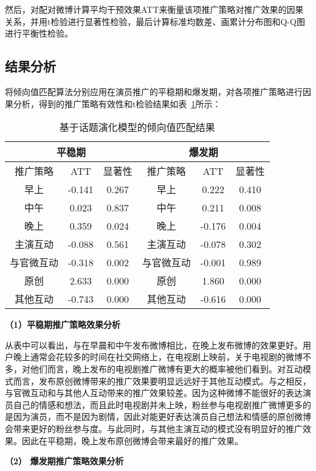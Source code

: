 然后，对配对微博计算平均干预效果ATT来衡量该项推广策略对推广效果的因果关系，并用t检验进行显著性检验，最后计算标准均数差、画累计分布图和Q-Q图进行平衡性检验。

\subsection{结果分析}

将倾向值匹配算法分别应用在演员推广的平稳期和爆发期，对各项推广策略进行因果分析，得到的推广策略有效性和t检验结果如表~\ref{res1}所示：

\begin{table}[!htbp]
\centering
\caption{基于话题演化模型的倾向值匹配结果}
\label{res1}
\begin{tabular}{|c|c|c|c|c|c|} \hline
\multicolumn{3}{|c|}{平稳期}& \multicolumn{3}{c|}{爆发期}\\ \hline
推广策略 & ATT & 显著性& 推广策略 & ATT & 显著性\\ \hline
早上 & -0.141 & 0.267& 早上 & 0.222 & 0.410\\%
中午 & 0.023 & 0.837 & 中午 & 0.211 & 0.008\\%
晚上 & 0.359 & 0.024 & 晚上 & -0.176 & 0.004\\ \hline
主演互动 & -0.088 & 0.561 &  主演互动 & -0.078 & 0.302\\
与官微互动& -0.318 & 0.002 & 与官微互动 & -0.001 & 0.989\\%
原创& 2.633 & 0.000 & 原创& 1.860 & 0.000\\
其他互动& -0.743 & 0.000 & 其他互动 & -0.616 & 0.000\\ \hline
\end{tabular}
\end{table}

\textbf{（1）平稳期推广策略效果分析}

从表中可以看出，与在早晨和中午发布微博相比，在晚上发布微博的效果更好。用户晚上通常会花较多的时间在社交网络上，在电视剧上映前，关于电视剧的微博不多，对他们而言，晚上发布的电视剧推广微博有更大的概率被他们看到。对互动模式而言，发布原创微博带来的推广效果要明显远远好于其他互动模式。与之相反，与官微互动和与其他人互动带来的推广效果较差。因为这种微博不能很好的表达演员自己的情感和想法，而且此时电视剧并未上映，粉丝参与电视剧推广微博更多的是因为演员，而不是因为剧情，因此对能更好表达演员自己想法和情感的原创微博会带来更好的粉丝参与度。与此同时，与其他主演互动的模式没有明显好的推广效果。因此在平稳期，晚上发布原创微博会带来最好的推广效果。

\textbf{（2） 爆发期推广策略效果分析}

